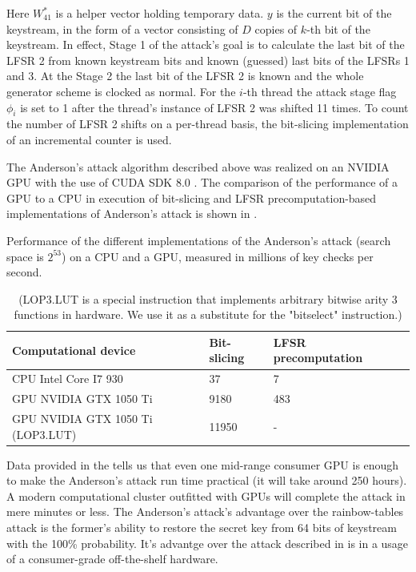 \documentclass[runningheads,a4paper]{llncs}[2015/06/24]
\begin{document}
Here $W^\ast_{41}$ is a helper vector holding temporary data. $y$ is the
current bit of the keystream, in the form of a vector consisting of $D$ copies
of $k$-th bit of the keystream. In effect, Stage 1 of the attack's goal is to
calculate the last bit of the LFSR 2 from known keystream bits and known
(guessed) last bits of the LFSRs 1 and 3. At the Stage 2 the last bit of the
LFSR 2 is known and the whole generator scheme is clocked as normal. For the
$i$-th thread the attack stage flag $\phi_i$ is set to 1 after the thread's
instance of LFSR 2 was shifted 11 times. To count the number of LFSR 2 shifts
on a per-thread basis, the bit-slicing implementation of an incremental counter
is used.

The Anderson's attack algorithm described above was realized on an NVIDIA GPU
with the use of CUDA SDK 8.0 \cite{CUDA}. The comparison of the performance of
a GPU to a CPU in execution of bit-slicing and LFSR precomputation-based
\cite{BSW} implementations of Anderson's attack is shown in
\cite{tab:gpuspeed}.


\begin{table} \caption{(LOP3.LUT is a special instruction that implements
	arbitrary bitwise arity 3 functions in hardware. We use it as a substitute
	for the "bitselect" instruction.)} 
	\label{tab:gpuspeed} Performance of the different implementations of the
	Anderson's attack (search space is $2^{53}$) on a CPU and a GPU, measured
	in millions of key checks per second.  
	\begin {center} \begin{tabular} {| l | l | l | l |} \hline Computational
		device & Bit-slicing & LFSR precomputation \cite{BSW} \\ \hline CPU
		Intel Core I7 930 & 37 & 7 \\ \hline GPU NVIDIA GTX 1050 Ti & 9180 &
		483 \\ \hline GPU NVIDIA GTX 1050 Ti (LOP3.LUT) & 11950 & - \\ \hline


	\end{tabular}
\end {center}
\end{table}

Data provided in the  tells us that even one mid-range
consumer GPU is enough to make the Anderson's attack run time practical (it
will take around 250 hours). A modern computational cluster outfitted with GPUs
will complete the attack in mere minutes or less. The Anderson's attack's
advantage over the rainbow-tables attack \cite{RAINBOW} is the former's ability
to restore the secret key from 64 bits of keystream with the 100\% probability.
It's advantge over the attack described in \cite{COPAC_1} is in a usage of a
consumer-grade off-the-shelf hardware.
\end{document}
